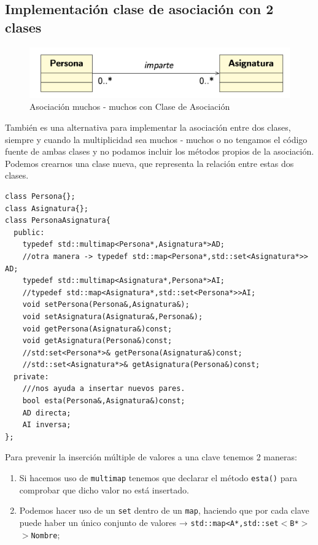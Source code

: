 \subsection{Implementación clase de asociación con 2 clases}

\begin{center}
	\begin{figure}[h]
	\includegraphics[width=\textwidth]{Imagenes/AClS2.png}
	\caption{Asociación muchos - muchos con Clase de Asociación}
\end{figure}
\end{center}
También es una alternativa para implementar la asociación entre dos clases, siempre y cuando la multiplicidad sea muchos - muchos o no tengamos el código fuente de ambas clases y no podamos incluir los métodos propios de la asociación.\vspace*{0,2cm}\\
Podemos crearnos una clase nueva, que representa la relación entre estas dos clases.
\begin{center}
	\begin{lstlisting}[frame=single]
class Persona{};
class Asignatura{};
class PersonaAsignatura{
  public:
	typedef std::multimap<Persona*,Asignatura*>AD;
	//otra manera -> typedef std::map<Persona*,std::set<Asignatura*>> AD;
	typedef std::multimap<Asignatura*,Persona*>AI;
	//typedef std::map<Asignatura*,std::set<Persona*>>AI;
	void setPersona(Persona&,Asignatura&);
	void setAsignatura(Asignatura&,Persona&);
	void getPersona(Asignatura&)const;
	void getAsignatura(Persona&)const;
	//std:set<Persona*>& getPersona(Asignatura&)const;
	//std::set<Asignatura*>& getAsignatura(Persona&)const;
  private:
  	///nos ayuda a insertar nuevos pares.
	bool esta(Persona&,Asignatura&)const;
	AD directa;
	AI inversa;
};
\end{lstlisting}
\end{center}
Para prevenir la inserción múltiple de valores a una clave tenemos 2 maneras:
\begin{enumerate}
	\item Si hacemos uso de \texttt{multimap} tenemos que declarar el método \texttt{esta()} para comprobar que dicho valor no está insertado.
	\item Podemos hacer uso de un \texttt {set} dentro de un \texttt{map}, haciendo que por cada clave puede haber un único conjunto de valores → \texttt{std::map<A*,std::set$<$B*$>$$>$Nombre$;$}\\

\end{enumerate}
